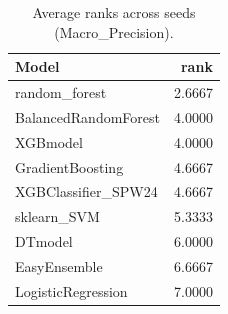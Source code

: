 \begin{table}[t]
\centering
\begin{tabular}{lr}
\toprule
Model & rank \\
\midrule
random_forest & 2.6667 \\
BalancedRandomForest & 4.0000 \\
XGBmodel & 4.0000 \\
GradientBoosting & 4.6667 \\
XGBClassifier_SPW24 & 4.6667 \\
sklearn_SVM & 5.3333 \\
DTmodel & 6.0000 \\
EasyEnsemble & 6.6667 \\
LogisticRegression & 7.0000 \\
\bottomrule
\end{tabular}
\caption{Average ranks across seeds (Macro_Precision).}
\label{tab:avg_rank_Macro_Precision}
\end{table}